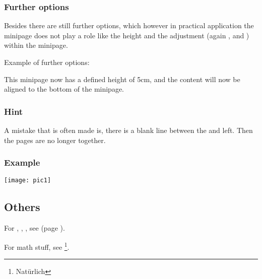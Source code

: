 \subsubsection{Further options}
Besides there are still further options, which however in practical application the minipage does not play a role like the height and the adjustment (again ,  and ) within the minipage.

Example of further options:

  This minipage now has a defined height of 5cm, and the content will now be aligned to the bottom of the minipage.
\subsubsection{Hint}

A mistake that is often made is, there is a blank line between the \code{\end{minipage}} and
\code{\begin{minipage}} left. Then the pages are no longer together.
  
\subsubsection{Example}
\begin{latex}
\begin{minipage}[t]{0.3\textwidth}
  \texttt{[image: pic1]}
\end{minipage}

\end{latex}

\subsection{Others}
For , , , see
 (page \pageref{docStructure}).

For math stuff, see \footnote{Natürlich}.
